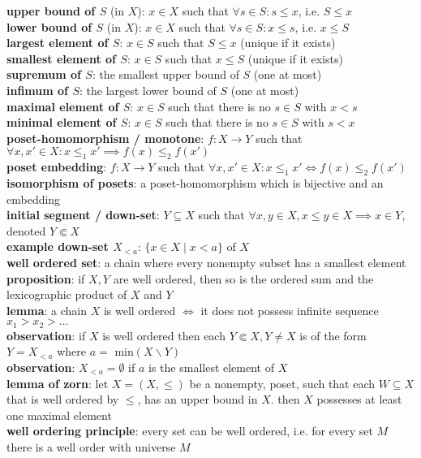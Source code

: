 \documentclass[a4paper]{article}
\begin{document}
\begin{framed}
	\noindent
	\textbf{upper bound of $S$} (in $X$): $x \in X$ such that $\forall s \in S: s \leq x$, i.e. $S \leq x$\\
	\textbf{lower bound of $S$} (in $X$): $x \in X$ such that $\forall s \in S: x \leq s$, i.e. $x \leq S$\\
	\textbf{largest element of $S$}: $x \in S$ such that $S \leq x$ (unique if it exists)\\
	\textbf{smallest element of $S$}: $x \in S$ such that $x \leq S$ (unique if it exists)\\
	\textbf{supremum of $S$}: the smallest upper bound of $S$ (one at most)\\
	\textbf{infimum of $S$}: the largest lower bound of $S$ (one at most)\\
	\textbf{maximal element of $S$}: $x \in S$ such that there is no $s \in S$ with $x < s$\\
	\textbf{minimal element of $S$}: $x \in S$ such that there is no $s \in S$ with $s < x$\\
	
	\noindent
	\textbf{poset-homomorphism / monotone}: $f: X \rightarrow Y$ such that $\forall x, x' \in X: x \leq_1 x' \implies f(x) \leq_2 f(x')$\\
	\textbf{poset embedding}: $f: X \rightarrow Y$ such that $\forall x, x' \in X: x \leq_1 x' \iff f(x) \leq_2 f(x')$\\
	\textbf{isomorphism of posets}: a poset-homomorphism which is bijective and an embedding\\
	
	\noindent
	\textbf{initial segment / down-set}: $Y \subseteq X$ such that $\forall x, y \in X, x \leq y \in X \implies x \in Y$, denoted $Y \Subset X$\\
	\textbf{example down-set $X_{< a}$}: $\{ x \in X \; \vert \; x < a \}$ of $X$\\
	
	\noindent
	\textbf{well ordered set}: a chain where every nonempty subset has a smallest element\\
	\textbf{proposition}: if $X, Y$ are well ordered, then so is the ordered sum and the lexicographic product of $X$ and $Y$\\
	\textbf{lemma}: a chain $X$ is well ordered $\iff$ it does not possess infinite sequence $x_1 > x_2 > \dots$\\
	\textbf{observation}: if $X$ is well ordered then each $Y \Subset X, Y \neq X$ is of the form $Y = X_{<a}$ where $a =$ min$(X \backslash Y)$\\
	\textbf{observation}: $X_{< a} = \emptyset$ if $a$ is the smallest element of $X$\\
	\textbf{lemma of zorn}: let $X = (X, \leq)$ be a nonempty, poset, such that each $W \subseteq X$ that is well ordered by $\leq$, has an upper bound in $X$. then $X$ possesses at least one maximal element\\
	\textbf{well ordering principle}: every set can be well ordered, i.e. for every set $M$ there is a well order with universe $M$\\
	

\end{framed}
\end{document}
